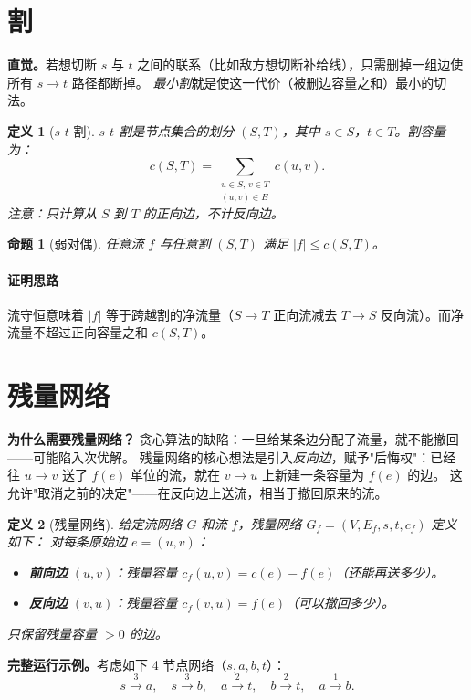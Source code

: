 \documentclass[UTF8,openany,12pt]{ctexbook}
\newtheorem{definition}{定义}[chapter]
\newtheorem{proposition}{命题}[chapter]
\theoremstyle{remark}
\newcommand{\proofidea}[1]{\paragraph{证明思路}#1}
\begin{document}
\section{割}

\noindent\textbf{直觉。}若想切断 $s$ 与 $t$ 之间的联系（比如敌方想切断补给线），只需删掉一组边使所有 $s\to t$ 路径都断掉。
\emph{最小割}就是使这一代价（被删边容量之和）最小的切法。

\begin{definition}[$s$-$t$ 割]
$s$-$t$ 割是节点集合的划分 $(S,T)$，其中 $s\in S$，$t\in T$。割容量为：
\[
  c(S,T)=\sum_{\substack{u\in S,\,v\in T\\(u,v)\in E}} c(u,v).
\]
注意：只计算从 $S$ 到 $T$ 的正向边，不计反向边。
\end{definition}

\begin{proposition}[弱对偶]
任意流 $f$ 与任意割 $(S,T)$ 满足 $|f|\le c(S,T)$。
\end{proposition}
\proofidea{流守恒意味着 $|f|$ 等于跨越割的净流量（$S\to T$ 正向流减去 $T\to S$ 反向流）。而净流量不超过正向容量之和 $c(S,T)$。}

\section{残量网络}

\noindent\textbf{为什么需要残量网络？}
贪心算法的缺陷：一旦给某条边分配了流量，就不能撤回——可能陷入次优解。
残量网络的核心想法是引入\emph{反向边}，赋予"后悔权"：已经往 $u\to v$ 送了 $f(e)$ 单位的流，就在 $v\to u$ 上新建一条容量为 $f(e)$ 的边。
这允许"取消之前的决定"——在反向边上送流，相当于撤回原来的流。

\begin{definition}[残量网络]
给定流网络 $G$ 和流 $f$，\emph{残量网络} $G_f=(V,E_f,s,t,c_f)$ 定义如下：
对每条原始边 $e=(u,v)$：
\begin{itemize}
  \item \textbf{前向边} $(u,v)$：残量容量 $c_f(u,v)=c(e)-f(e)$（还能再送多少）。
  \item \textbf{反向边} $(v,u)$：残量容量 $c_f(v,u)=f(e)$（可以撤回多少）。
\end{itemize}
只保留残量容量 $>0$ 的边。
\end{definition}

\noindent\textbf{完整运行示例。}考虑如下 4 节点网络（$s,a,b,t$）：
\[
  s\xrightarrow{3} a,\quad s\xrightarrow{3} b,\quad a\xrightarrow{2} t,\quad b\xrightarrow{2} t,\quad a\xrightarrow{1} b.
\]
\end{document}
